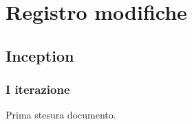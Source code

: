 \documentclass[10pt]{softeng}
\begin{document}
\startofdocument









\section{Registro modifiche}

\subsection{Inception}

\subsubsection{I iterazione}

Prima stesura documento.
\end{document}
